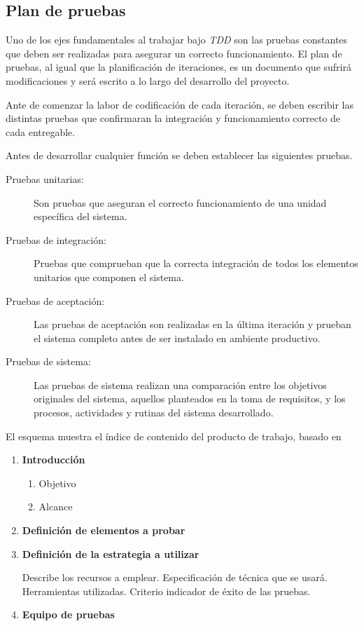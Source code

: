 \subsection{Plan de pruebas}

Uno de los ejes fundamentales al trabajar bajo \textit{TDD} son las pruebas constantes que deben ser realizadas para asegurar un correcto funcionamiento. El plan de pruebas, al igual que la planificación de iteraciones, es un documento que sufrirá modificaciones y será escrito a lo largo del desarrollo del proyecto.

Ante de comenzar la labor de codificación de cada iteración, se deben escribir las distintas pruebas que confirmaran la integración y funcionamiento correcto de cada entregable. 

Antes de desarrollar cualquier función se deben establecer las siguientes pruebas. 

\begin{description}
	\item[Pruebas unitarias:]\hfill

	Son pruebas que aseguran el correcto funcionamiento de una unidad específica del sistema. 

	\item[Pruebas de integración:]\hfill

	Pruebas que comprueban que la correcta integración de todos los elementos unitarios que componen el sistema.

	\item[Pruebas de aceptación:]\hfill

	Las pruebas de aceptación son realizadas en la última iteración y prueban el sistema completo antes de ser instalado en ambiente productivo.

	\item[Pruebas de sistema:]\hfill

	Las pruebas de sistema realizan una comparación entre los objetivos originales del sistema, aquellos planteados en la toma de requisitos, y los procesos, actividades y rutinas del sistema desarrollado.
\end{description}

El esquema muestra el índice de contenido del producto de trabajo, basado en \citet{mem00}

\begin{framed}
     \begin{enumerate}
		\item \textbf{Introducción}
		\begin{enumerate}
			\item Objetivo
			\item Alcance 
		\end{enumerate}
		\item \textbf{Definición de elementos a probar}	
		\item \textbf{Definición de la estrategia a utilizar}

		Describe los recursos a emplear. Especificación de técnica que se usará. Herramientas utilizadas. Criterio indicador de éxito de las pruebas.
		\item \textbf{Equipo de pruebas}
	\end{enumerate}
\end{framed}

